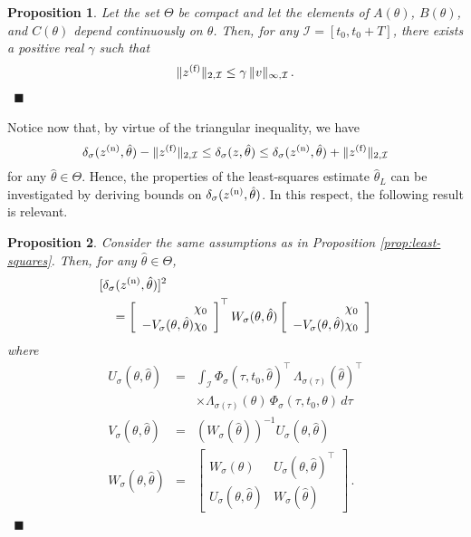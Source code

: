 \documentclass[letterpaper, 10 pt, conference]{ieeetran}
\def\qedp{\hspace*{\fill}~{\tiny $\blacksquare$}}
\newtheorem{itproposition}{Proposition}
\newenvironment{proposition}{\begin{itproposition}\rm}{\end{itproposition}}
\begin{document}
\begin{proposition}
Let the set $\Theta$ be compact and let the elements of $A(\theta)$, $B(\theta)$, and $C(\theta)$ depend continuously on $\theta$.
Then, for any $\mathcal I = [t_0, t_0 + T] $, there exists a positive real $\gamma$ such that
\begin{equation}\label{eq:bound2}
\| z^{({\rm f})} \|_{2, \mathcal I} \le \gamma \, \| v \|_{\infty,\mathcal I}  \, .
\end{equation}
\qedp
\end{proposition}

Notice now that, by virtue of the triangular inequality, we have
\begin{equation}\label{eq:triangular}
 {\delta_{\sigma}(z^{({\rm n})} ,{\hat \theta})} - \| z^{({\rm f})} \|_{2, \mathcal I}  \le {\delta_{\sigma}(z,{\hat \theta})} \le {\delta_{\sigma}(z^{({\rm n})} ,{\hat \theta})} + \| z^{({\rm f})} \|_{2, \mathcal I} 
\end{equation}
for any $\hat \theta \in \Theta$. Hence, the properties of the least-squares estimate $\hat \theta_L$ can be investigated by deriving bounds on $ {\delta_{\sigma}(z^{({\rm n})} ,{\hat \theta})}$.
In this respect, the following result is relevant. 

\begin{proposition}
Consider the same assumptions as in Proposition \ref{prop:least-squares}. Then, for any 
$\hat \theta \in \Theta$,
\begin{eqnarray*}
\lefteqn{ [{\delta_{\sigma}(z^{({\rm n})} ,{\hat \theta})}]^2} \\ && {} = \left [ \begin{array}{r} \chi_0 \\ -V_\sigma(\theta,\hat \theta) \chi_0 \end{array} \right ]^\top  
  W_\sigma(\theta,\hat \theta) \left [ \begin{array}{r} \chi_0 \\ -V_\sigma(\theta,\hat \theta) \chi_0 \end{array} \right ]
\end{eqnarray*}
where
\begin{eqnarray}
U_\sigma(\theta,\hat \theta) &=& 
 \int_{\mathcal I}  \Phi_{\sigma} (\tau,t_0,\hat \theta)
^\top \, \Lambda_{\sigma(\tau)}  (\hat \theta)^\top   \nonumber \\
&& \times \Lambda_{\sigma(\tau)}  ( \theta)  \, \Phi_{\sigma} (\tau,t_0,\theta) \, d\tau \\
V_\sigma(\theta,\hat \theta) &=& \left ( W_\sigma (\hat \theta)  \right )^{-1}  U_\sigma(\theta,\hat \theta)   \label{eq:V}  \\
W_\sigma(\theta,\hat \theta) &=& \left [ \begin{array}{ll} W_\sigma ( \theta) & U_\sigma(\theta,\hat \theta)^\top   \\ U_\sigma(\theta,\hat \theta)   & W_\sigma (\hat \theta)  \end{array} \right] \, .  \label{eq:W}
\end{eqnarray}
\qedp
\end{proposition}
\end{document}

